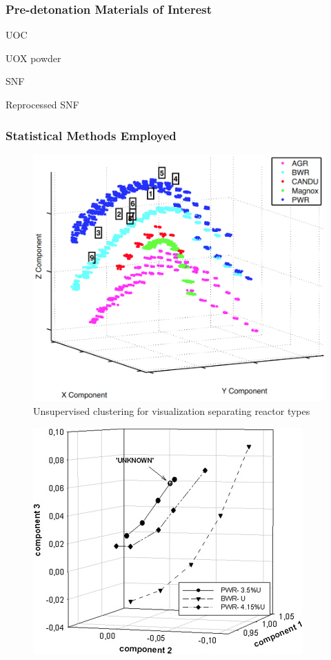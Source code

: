 
\begin{frame}
  \frametitle{Pre-detonation Materials of Interest}
  UOC

  UOX powder

  SNF

  Reprocessed SNF
\end{frame}

\begin{frame}
  \frametitle{Statistical Methods Employed}
  \begin{minipage}[t]{0.45\textwidth}
    \begin{figure}
      \raggedleft
      \includegraphics[width=1\linewidth]{./figures/sfcompo.png}
      \caption{Unsupervised clustering for visualization separating reactor types \cite{jones_viz_2014}}
    \end{figure}
  \end{minipage}\hfill
  \begin{minipage}[t]{0.45\textwidth}
    \begin{figure}
      \raggedright
      \includegraphics[width=1\linewidth]{./figures/nicolaou.jpg}

\end{figure}
\end{minipage}
\end{frame}
